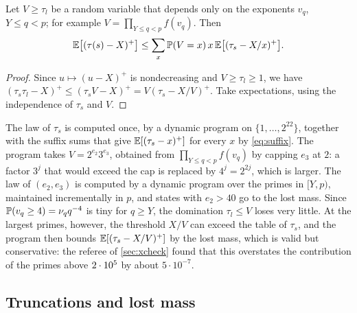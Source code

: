 \begin{lemma}\label{lem:tausplit}
Let $V\ge\tau_l$ be a random variable that depends only on the exponents $v_q$, $Y\le q<p$; for example
$V=\prod_{Y\le q<p}f(v_q)$. Then
\[
  \E\bigl[(\tau(s)-X)^+\bigr]\le\sum_{x}\P(V=x)\,x\,\E\bigl[(\tau_s-X/x)^+\bigr].
\]
\end{lemma}

\begin{proof}
Since $u\mapsto(u-X)^+$ is nondecreasing and $V\ge\tau_l\ge1$, we have
$(\tau_s\tau_l-X)^+\le(\tau_sV-X)^+=V(\tau_s-X/V)^+$. Take expectations, using the independence of $\tau_s$ and $V$.
\end{proof}

The law of $\tau_s$ is computed once, by a dynamic program on $\{1,\dots,2^{22}\}$, together with the suffix sums
that give $\E[(\tau_s-x)^+]$ for every $x$ by \eqref{eq:suffix}. The program takes $V=2^{e_2}3^{e_3}$, obtained from
$\prod_{Y\le q<p}f(v_q)$ by capping $e_3$ at $2$: a factor $3^j$ that would exceed the cap is replaced by
$4^j=2^{2j}$, which is larger. The law of $(e_2,e_3)$ is computed by a dynamic program over the primes in $[Y,p)$,
maintained incrementally in $p$, and states with $e_2>40$ go to the lost mass. Since $\P(v_q\ge4)=\nu_qq^{-4}$ is tiny for $q\ge Y$, the domination $\tau_l\le V$ loses very little. At the
largest primes, however, the threshold $X/V$ can exceed the table of $\tau_s$, and the program then bounds
$\E[(\tau_s-X/V)^+]$ by the lost mass, which is valid but conservative: the referee of \cref{sec:xcheck} found that
this overstates the contribution of the primes above $\PX$ by about $5\cdot10^{-7}$.

\subsection{Truncations and lost mass}\label{sec:lost}

